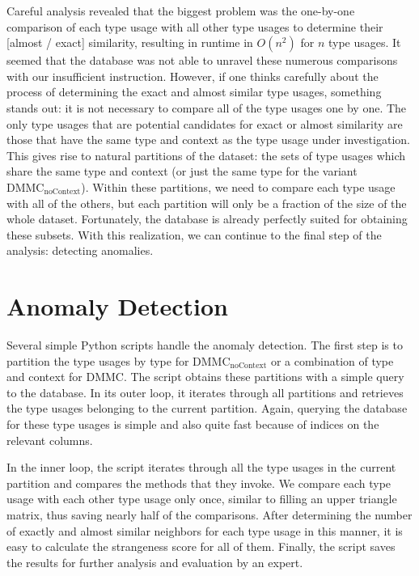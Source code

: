 Careful analysis revealed that the biggest problem was the one-by-one comparison of each type usage with all other type usages to determine their [almost / exact] similarity, resulting in runtime in $O(n^2)$ for $n$ type usages.
It seemed that the database was not able to unravel these numerous comparisons with our insufficient instruction.
However, if one thinks carefully about the process of determining the exact and almost similar type usages, something stands out: it is not necessary to compare all of the type usages one by one.
The only type usages that are potential candidates for exact or almost similarity are those that have the same type and context as the type usage under investigation.
This gives rise to natural partitions of the dataset: the sets of type usages which share the same type and context (or just the same type for the variant $\text{DMMC}_\text{noContext}$).
Within these partitions, we need to compare each type usage with all of the others, but each partition will only be a fraction of the size of the whole dataset.
Fortunately, the database is already perfectly suited for obtaining these subsets.
With this realization, we can continue to the final step of the analysis: detecting anomalies.

\section{Anomaly Detection}\label{sec:anomaly}


Several simple Python scripts handle the anomaly detection.
The first step is to partition the type usages by type for $\text{DMMC}_\text{noContext}$ or a combination of type and context for $\text{DMMC}$.
The script obtains these partitions with a simple query to the database.
In its outer loop, it iterates through all partitions and retrieves the type usages belonging to the current partition.
Again, querying the database for these type usages is simple and also quite fast because of indices on the relevant columns.

In the inner loop, the script iterates through all the type usages in the current partition and compares the methods that they invoke.
We compare each type usage with each other type usage only once, similar to filling an upper triangle matrix, thus saving nearly half of the comparisons.
After determining the number of exactly and almost similar neighbors for each type usage in this manner, it is easy to calculate the strangeness score for all of them.
Finally, the script saves the results for further analysis and evaluation by an expert.

